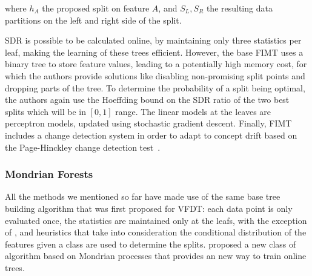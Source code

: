 \noindent
where $h_A$ the proposed split on feature $A$, and $S_L, S_R$ the resulting
data partitions on the left and right side of the split.

SDR is possible to be calculated online, by maintaining only three statistics per leaf,
making the learning of these trees efficient. However, the base FIMT uses a binary tree
to store feature values, leading to a potentially high memory cost, for which
the authors provide solutions like disabling non-promising split points and dropping
parts of the tree. To determine the
probability of a split being optimal, the authors again use the Hoeffding bound
on the SDR ratio of the two best splits which will be in $[0, 1]$ range.
The linear models at the leaves are perceptron models, updated using stochastic
gradient descent.  Finally, FIMT includes a change detection system in order to
adapt to concept drift 
based on the Page-Hinckley change detection test~\cite{ph-test, ph-test2}.


\subsubsection*{Mondrian Forests}

All the methods we mentioned so far have made use of the same base tree building
algorithm that was first proposed for VFDT: each data point is only evaluated once,
the statistics are maintained only at the leafs, with the exception of \cite{efdt},
and heuristics that take into consideration the conditional distribution of the
features given a class are used to determine the splits. \citet{mondrian-forests-original}
proposed a new class of algorithm based on Mondrian processes \cite{mondrian-process}
that provides an new way to train online trees.

